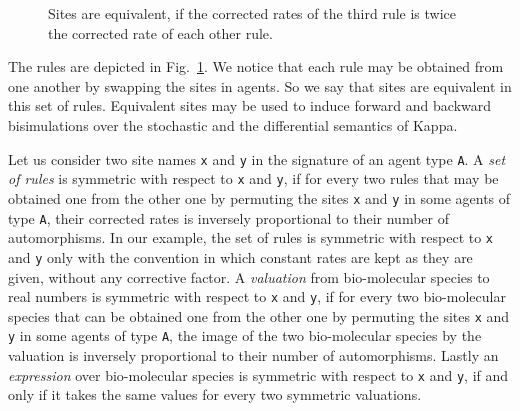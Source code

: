 \documentclass[11pt]{book}
\def\ttt#1{\texttt{#1}}
\begin{document}
\begin{figure}[t]
  \begin{minipage}{0.3\linewidth}
    \centering{}
  \end{minipage}\hspace*{5mm}
  \begin{minipage}{0.3\linewidth}
  \end{minipage}\hspace*{5mm}
\begin{minipage}{0.3\linewidth}
    \centering{}
  \end{minipage}
  \caption{Sites are equivalent, if the corrected rates of the third rule is twice the corrected rate of each other rule.}
  \label{fig:symmetric:rules}
\end{figure}

The rules are depicted in Fig.~\ref{fig:symmetric:rules}. We notice that each rule may be obtained from one another by swapping the sites in agents.  So we say that sites are equivalent in this set of rules. Equivalent sites may be used to induce forward and backward bisimulations \cite{buchholz_bisimulation,Feret_IJSI2013,Feret-MFPSXXVII,CAMPORESI201073,Feret201545} over the stochastic and the differential semantics of Kappa.

Let us consider two site names \ttt{x} and \ttt{y} in the signature of an agent type \ttt{A}.
A \emph{set of rules} is symmetric with respect to \ttt{x} and \ttt{y}, if for every two rules that may be obtained one from the other one by permuting the sites \ttt{x} and \ttt{y} in some agents of type \ttt{A}, their corrected rates is inversely proportional to their number of automorphisms.
In our example,  the set of rules is symmetric with respect to \ttt{x} and \ttt{y} only with the convention in which constant rates are kept as they are given, without any corrective factor. A \emph{valuation} from bio-molecular species to real numbers is symmetric with respect to \ttt{x} and \ttt{y}, if for every two bio-molecular species that can be obtained one from the other one by permuting the sites \ttt{x} and \ttt{y} in some agents of type \ttt{A}, the image of the two bio-molecular species by the valuation is inversely proportional to their number of automorphisms. Lastly an \emph{expression} over bio-molecular species is symmetric with respect to \ttt{x} and \ttt{y}, if and only if it takes the same values for every two symmetric valuations.
\end{document}
